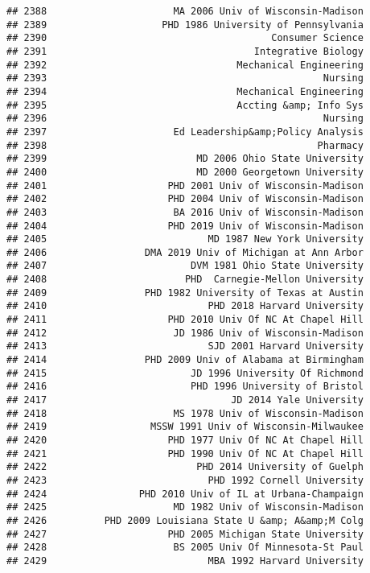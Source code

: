 \documentclass[
]{article}
\begin{document}
\begin{verbatim}
## 2388                      MA 2006 Univ of Wisconsin-Madison
## 2389                    PHD 1986 University of Pennsylvania
## 2390                                       Consumer Science
## 2391                                    Integrative Biology
## 2392                                 Mechanical Engineering
## 2393                                                Nursing
## 2394                                 Mechanical Engineering
## 2395                                 Accting &amp; Info Sys
## 2396                                                Nursing
## 2397                      Ed Leadership&amp;Policy Analysis
## 2398                                               Pharmacy
## 2399                          MD 2006 Ohio State University
## 2400                          MD 2000 Georgetown University
## 2401                     PHD 2001 Univ of Wisconsin-Madison
## 2402                     PHD 2004 Univ of Wisconsin-Madison
## 2403                      BA 2016 Univ of Wisconsin-Madison
## 2404                     PHD 2019 Univ of Wisconsin-Madison
## 2405                            MD 1987 New York University
## 2406                 DMA 2019 Univ of Michigan at Ann Arbor
## 2407                         DVM 1981 Ohio State University
## 2408                        PHD  Carnegie-Mellon University
## 2409                 PHD 1982 University of Texas at Austin
## 2410                            PHD 2018 Harvard University
## 2411                     PHD 2010 Univ Of NC At Chapel Hill
## 2412                      JD 1986 Univ of Wisconsin-Madison
## 2413                            SJD 2001 Harvard University
## 2414                 PHD 2009 Univ of Alabama at Birmingham
## 2415                         JD 1996 University Of Richmond
## 2416                         PHD 1996 University of Bristol
## 2417                                JD 2014 Yale University
## 2418                      MS 1978 Univ of Wisconsin-Madison
## 2419                  MSSW 1991 Univ of Wisconsin-Milwaukee
## 2420                     PHD 1977 Univ Of NC At Chapel Hill
## 2421                     PHD 1990 Univ Of NC At Chapel Hill
## 2422                          PHD 2014 University of Guelph
## 2423                            PHD 1992 Cornell University
## 2424                PHD 2010 Univ of IL at Urbana-Champaign
## 2425                      MD 1982 Univ of Wisconsin-Madison
## 2426          PHD 2009 Louisiana State U &amp; A&amp;M Colg
## 2427                     PHD 2005 Michigan State University
## 2428                      BS 2005 Univ Of Minnesota-St Paul
## 2429                            MBA 1992 Harvard University

\end{verbatim}
\end{document}
